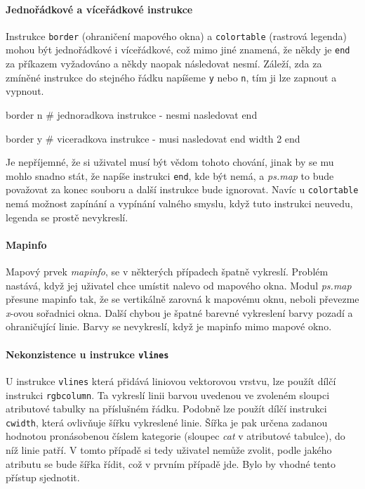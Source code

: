 \documentclass[a4paper,12pt,draft]{article}
\newcommand{\modul}[1]{\emph{#1}}
\newcommand{\instr}[1]{\lstinline[style=psmapInline]|#1|}
\begin{document}
\paragraph*{Jednořádkové a víceřádkové instrukce}
\label{sec:psmap:singleline}
Instrukce \instr{border} (ohraničení mapového okna) a \instr{colortable} (rastrová legenda) mohou být jednořádkové i víceřádkové, což mimo jiné znamená, že někdy je \instr{end} za příkazem vyžadováno a někdy naopak následovat nesmí. Záleží, zda za zmíněné instrukce do stejného řádku napíšeme \instr{y} nebo \instr{n}, tím ji lze zapnout a vypnout. 
\begin{psmap}
border n    # jednoradkova instrukce - nesmi nasledovat end

border y    # viceradkova instrukce - musi nasledovat end
   width 2
end
\end{psmap}
Je nepříjemné, že si uživatel musí být vědom tohoto chování, jinak by se mu mohlo snadno stát, že napíše instrukci \instr{end}, kde být nemá, a \modul{ps.map} to bude považovat za konec souboru a další instrukce bude ignorovat.
Navíc u \instr{colortable} nemá možnost zapínání a vypínání valného smyslu, když tuto instrukci neuvedu, legenda se prostě nevykreslí.

\paragraph*{Mapinfo}
\label{sec:psmap:mapinfo}
Mapový prvek \emph{mapinfo}, se v některých případech špatně vykreslí. Problém nastává, když jej uživatel chce umístit nalevo od mapového okna. Modul \modul{ps.map} přesune mapinfo tak, že se vertikálně zarovná k mapovému oknu, neboli převezme \emph{x}-ovou sořadnici okna. Další chybou je špatné barevné vykreslení barvy pozadí a ohraničující linie. Barvy se nevykreslí, když je mapinfo  mimo mapové okno. 

\paragraph*{Nekonzistence u instrukce \instr{vlines}}
\label{sec:psmap:vlines}
U instrukce \instr{vlines} která přidává liniovou vektorovou vrstvu, lze použít dílčí instrukci \instr{rgbcolumn}. Ta vykreslí   linii barvou uvedenou ve zvoleném sloupci atributové tabulky na příslušném řádku. Podobně lze použít dílčí instrukci \instr{cwidth}, která ovlivňuje šířku vykreslené linie. Šířka je pak určena zadanou hodnotou pronásobenou číslem kategorie (sloupec \emph{cat} v atributové tabulce), do níž linie patří. V tomto případě si tedy uživatel nemůže zvolit, podle jakého atributu se bude šířka řídit, což v prvním případě jde. Bylo by vhodné tento přístup sjednotit. 
\end{document}
